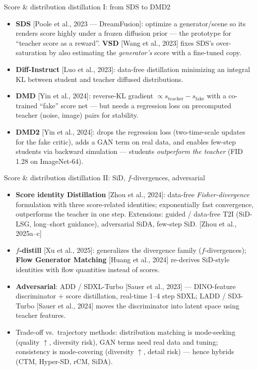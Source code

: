 \documentclass[aspectratio=169,10pt]{beamer}
\newcommand{\litref}[1]{{\scriptsize\color{black!55}[#1]}}
\begin{document}
\begin{frame}{Score \& distribution distillation I: from SDS to DMD2}
  \begin{itemize}
    \item \textbf{SDS} \litref{Poole et al., 2023 --- DreamFusion}: optimize a
      generator/scene so its renders score highly under a frozen diffusion
      prior --- the prototype for ``teacher score as a reward''.
      \textbf{VSD} \litref{Wang et al., 2023} fixes SDS's over-saturation by
      also estimating the \emph{generator's} score with a fine-tuned copy.
    \item \textbf{Diff-Instruct} \litref{Luo et al., 2023}: data-free
      distillation minimizing an integral KL between student and teacher
      diffused distributions.
    \item \textbf{DMD} \litref{Yin et al., 2024}: reverse-KL gradient
      $\propto s_{\mathrm{teacher}} - s_{\mathrm{fake}}$ with a co-trained
      ``fake'' score net --- but needs a regression loss on precomputed
      teacher (noise, image) pairs for stability.
    \item \textbf{DMD2} \litref{Yin et al., 2024}: drops the regression loss
      (two-time-scale updates for the fake critic), adds a GAN term on real
      data, and enables few-step students via backward simulation ---
      students \emph{outperform the teacher} (FID 1.28 on ImageNet-64).
  \end{itemize}
\end{frame}

\begin{frame}{Score \& distribution distillation II: SiD, $f$-divergences, adversarial}
  \begin{itemize}
    \item \textbf{Score identity Distillation} \litref{Zhou et al., 2024}:
      data-free \emph{Fisher-divergence} formulation with three score-related
      identities; exponentially fast convergence, outperforms the teacher in
      one step. Extensions: guided / data-free T2I (SiD-LSG, long--short
      guidance), adversarial SiDA, few-step SiD.
      \litref{Zhou et al., 2025a--c}
    \item \textbf{$f$-distill} \litref{Xu et al., 2025}: generalizes the
      divergence family ($f$-divergences); \textbf{Flow Generator Matching}
      \litref{Huang et al., 2024} re-derives SiD-style identities with flow
      quantities instead of scores.
    \item \textbf{Adversarial}: ADD / SDXL-Turbo
      \litref{Sauer et al., 2023} --- DINO-feature discriminator $+$ score
      distillation, real-time 1--4 step SDXL; LADD / SD3-Turbo
      \litref{Sauer et al., 2024} moves the discriminator into latent space
      using teacher features.
    \item Trade-off vs.\ trajectory methods: distribution matching is
      mode-seeking (quality $\uparrow$, diversity risk), GAN terms need real
      data and tuning; consistency is mode-covering (diversity $\uparrow$,
      detail risk) --- hence hybrids (CTM, Hyper-SD, rCM, SiDA).
  \end{itemize}
\end{frame}
\end{document}
